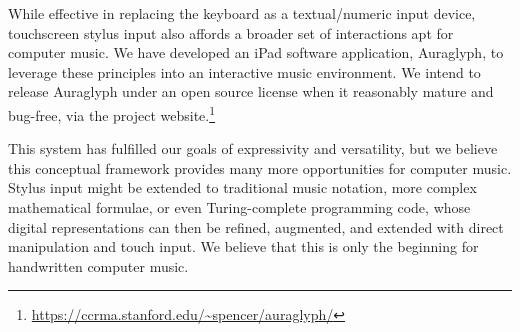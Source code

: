 \documentclass{nime-alternate}
\begin{document}
While effective in replacing the keyboard as a textual/numeric input device, touchscreen stylus input also affords a broader set of interactions apt for computer music. 
We have developed an iPad software application, Auraglyph, to leverage these principles into an interactive music environment. 
We intend to release Auraglyph under an open source license when it reasonably mature and bug-free, via the project website.\footnote{\url{https://ccrma.stanford.edu/~spencer/auraglyph/}}

This system has fulfilled our goals of expressivity and versatility, but we believe this conceptual framework provides many more opportunities for computer music. 
Stylus input might be extended to traditional music notation, more complex mathematical formulae, or even Turing-complete programming code, whose digital representations can then be refined, augmented, and extended with direct manipulation and touch input. 
We believe that this is only the beginning for handwritten computer music. 


%

%
%


\end{document}
